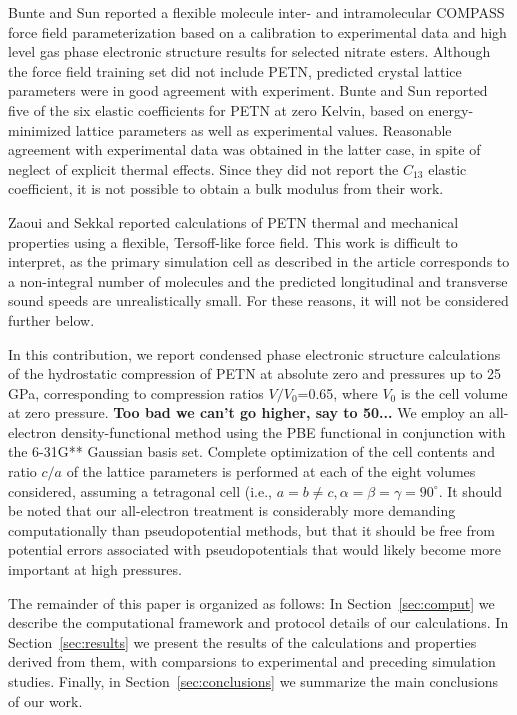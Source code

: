 \documentclass[prb,aps,nobibnotes,twocolumn,doublespace,twocolumngrid,superbib]{revtex4}
\begin{document}
Bunte and Sun\cite{Bunte_2000v104}
reported a flexible molecule inter- and intramolecular COMPASS force field 
parameterization based on a calibration to experimental data and high level 
gas phase electronic structure results for selected nitrate esters.  
Although the force field training set did not include PETN, predicted 
crystal lattice parameters were in good agreement with experiment.  Bunte 
and Sun reported five of the six elastic coefficients for PETN at zero 
Kelvin, based on energy-minimized lattice parameters as well as experimental 
values.  Reasonable agreement with experimental data was obtained in the 
latter case, in spite of neglect of explicit thermal effects.  Since they 
did not report the $C_{13}$ elastic coefficient, it is not possible to obtain 
a bulk modulus from their work.

Zaoui and Sekkal\cite{Zaoui_2001v118} reported 
calculations of PETN thermal and mechanical properties using a flexible, 
Tersoff-like force field.  This work is difficult to interpret, as the 
primary simulation cell as described in the article corresponds to a 
non-integral number of molecules and the predicted longitudinal and 
transverse sound speeds are unrealistically small.  For these reasons, 
it will not be considered further below.

In this contribution, we report condensed phase electronic structure
calculations of the hydrostatic compression of PETN at absolute zero
and pressures up to 25 GPa, corresponding to compression ratios $V/V_0$=0.65,
where $V_0$ is the cell volume at zero pressure. {\bf Too bad we can't go 
higher, say to 50...} We employ an all-electron density-functional method 
using the PBE functional in conjunction with the 6-31G** Gaussian basis set.   
Complete optimization of the cell contents and ratio $c/a$ of the lattice 
parameters is performed at each of the eight volumes considered, assuming 
a tetragonal cell (i.e., $a=b \neq c, \alpha=\beta=\gamma=90^\circ$.
It should be noted that our all-electron treatment is considerably more
demanding computationally than pseudopotential methods, but that it should
be free from potential errors associated with pseudopotentials that would
likely become more important at high pressures.

The remainder of this paper is organized as follows: In
Section~\ref{sec:comput} we describe the computational framework and
protocol details of our calculations. In Section~\ref{sec:results} we 
present the results of the calculations and properties derived from them,
with comparsions to experimental and preceding simulation studies. 
Finally, in Section~\ref{sec:conclusions} we summarize the main conclusions
of our work.
\end{document}

